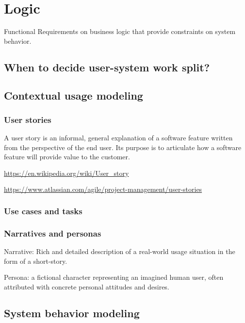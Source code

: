 
\chapter{Logic}%

Functional Requirements on business logic that provide constraints on system behavior.


\section{When to decide user-system work split?}

\section{Contextual usage modeling}%

\subsection{User stories}

A user story is an informal, general explanation of a software feature written from the perspective of the end user. Its purpose is to articulate how a software feature will provide value to the customer.

\url{https://en.wikipedia.org/wiki/User_story}

\url{https://www.atlassian.com/agile/project-management/user-stories}

\subsection{Use cases and tasks}

\subsection{Narratives and personas}

Narrative: Rich and detailed description of a real-world usage situation in the form of a short-story.

Persona: a fictional character representing an imagined human user, often attributed with concrete personal attitudes and desires. 


\section{System behavior modeling}

